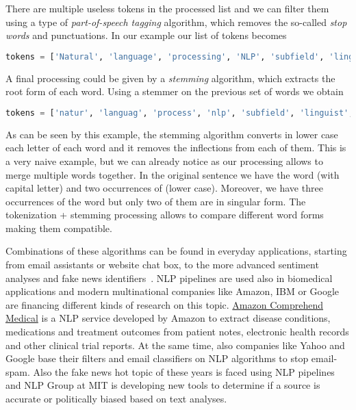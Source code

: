 \documentclass{standalone}
\begin{document}
There are multiple useless tokens in the processed list and we can filter them using a type of \emph{part-of-speech tagging} algorithm, which removes the so-called \emph{stop words} and punctuations.
In our example our list of tokens becomes

\lstset{style=snippet}
\begin{lstlisting}[language=Python, caption=Filtering stop-words and punctuations, label=code:filter]
tokens = ['Natural', 'language', 'processing', 'NLP', 'subfield', 'linguistics', 'computer', 'science', 'information', 'engineering', 'artificial', 'intelligence', 'concerned', 'interactions', 'computers','human', 'natural', 'languages', 'particular', 'program', 'computers', 'process', 'analyze', 'large', 'amounts', 'natural', 'language', 'data']
\end{lstlisting}

A final processing could be given by a \emph{stemming} algorithm, which extracts the root form of each word.
Using a stemmer on the previous set of words we obtain

\lstset{style=snippet}
\begin{lstlisting}[language=Python, caption=Stemming, label=code:stem]
tokens = ['natur', 'languag', 'process', 'nlp', 'subfield', 'linguist', 'comput', 'scienc', 'inform', 'engin', 'artifici', 'intellig', 'concern', 'interact', 'comput', 'human', 'natur', 'languag', 'particular', 'program', 'comput', 'process', 'analyz', 'larg', 'amount', 'natur', 'languag', 'data']
\end{lstlisting}

As can be seen by this example, the stemming algorithm converts in lower case each letter of each word and it removes the inflections from each of them.
This is a very naive example, but we can already notice as our processing allows to merge multiple words together.
In the original sentence we have the word  (with capital letter) and two occurrences of  (lower case).
Moreover, we have three occurrences of the  word but only two of them are in singular form.
The tokenization + stemming processing allows to compare different word forms making them compatible.

Combinations of these algorithms can be found in everyday applications, starting from email assistants or website chat box, to the more advanced sentiment analyses and fake news identifiers~\cite{IJST119594, MitaliSentiment2016, sharma2019combating, zhou2018fake}.
NLP pipelines are used also in biomedical applications and modern multinational companies like Amazon, IBM or Google are financing different kinds of research on this topic.
\href{https://aws.amazon.com/it/comprehend/medical/}{Amazon Comprehend Medical} is a NLP service developed by Amazon to extract disease conditions, medications and treatment outcomes from patient notes, electronic health records and other clinical trial reports.
At the same time, also companies like Yahoo and Google base their filters and email classifiers on NLP algorithms to stop email-spam.
Also the fake news hot topic of these years is faced using NLP pipelines and NLP Group at MIT is developing new tools to determine if a source is accurate or politically biased based on text analyses.
\end{document}
